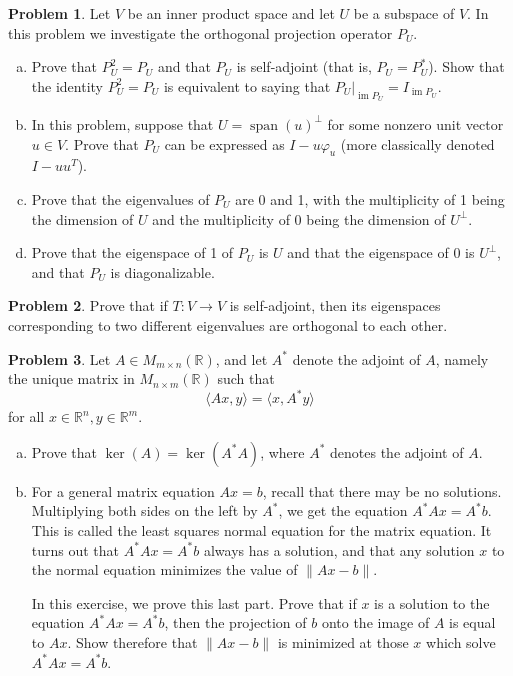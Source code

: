 \documentclass[11pt,oneside]{amsart}
\theoremstyle{definition}
\newtheorem{problem}{Problem}
\newcommand{\bR}{\mathbb{R}}
\DeclareMathOperator{\Span}{span}
\DeclareMathOperator{\im}{im}
\begin{document}
    \begin{problem}
        Let $V$ be an inner product space and let $U$ be a subspace of $V$. In this problem we investigate the orthogonal projection operator $P_U$.
        \begin{enumerate}[(a)]
            \item Prove that $P_U^2=P_U$ and that $P_U$ is self-adjoint (that is, $P_U=P_U^*$). Show that the identity $P_U^2=P_U$ is equivalent to saying that $P_U|_{\im P_U}=I_{\im P_U}$. 
            \item In this problem, suppose that $U=\Span(u)^\perp$ for some nonzero unit vector $u\in V$. Prove that $P_U$ can be expressed as $I-u\varphi_u$ (more classically denoted $I-uu^T$).
            \item Prove that the eigenvalues of $P_U$ are 0 and 1, with the multiplicity of 1 being the dimension of $U$ and the multiplicity of 0 being the dimension of $U^\perp$.
            \item Prove that the eigenspace of 1 of $P_U$ is $U$ and that the eigenspace of 0 is $U^\perp$, and that $P_U$ is diagonalizable.
        \end{enumerate}
    \end{problem}

    \begin{problem}
        Prove that if $T\colon V\to V$ is self-adjoint, then its eigenspaces corresponding to two different eigenvalues are orthogonal to each other.
    \end{problem}

    \begin{problem}
        Let $A\in M_{m\times n}(\bR)$, and let $A^*$ denote the adjoint of $A$, namely the unique matrix in $M_{n\times m}(\bR)$ such that
        \[\langle Ax,y\rangle=\langle x,A^*y\rangle\]
        for all $x\in \bR^n, y\in\bR^m$.
        \leavevmode\begin{enumerate}[(a)]
            \item Prove that $\ker(A)=\ker(A^*A)$, where $A^*$ denotes the adjoint of $A$.
            \item For a general matrix equation $Ax=b$, recall that there may be no solutions. Multiplying both sides on the left by $A^*$, we get the equation $A^*Ax=A^*b$. This is called the least squares normal equation for the matrix equation. It turns out that $A^*Ax=A^*b$ always has a solution, and that any solution $x$ to the normal equation minimizes the value of $\|Ax-b\|$.
            
            In this exercise, we prove this last part. Prove that if $x$ is a solution to the equation $A^*Ax=A^*b$, then the projection of $b$ onto the image of $A$ is equal to $Ax$. Show therefore that $\|Ax-b\|$ is minimized at those $x$ which solve $A^*Ax=A^*b$.
        \end{enumerate}
    \end{problem}
\end{document}
